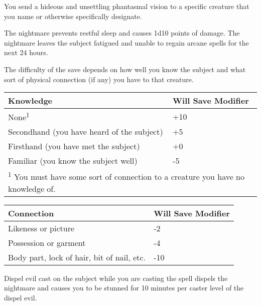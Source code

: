 \begin{multicols}{2}
\begin{small}

\noindent You send a hideous and unsettling phantasmal vision to a specific creature that you name or otherwise specifically designate.

\smallskip\noindent The nightmare prevents restful sleep and causes 1d10 points of damage. The nightmare leaves the subject fatigued and unable to regain arcane spells for the next 24 hours.

\smallskip\noindent The difficulty of the save depends on how well you know the subject and what sort of physical connection (if any) you have to that creature.

\begin{center}
\begin{tabular}[h!]{p{1.75in}|l}
Knowledge & Will Save Modifier \\ \hline
None\textsuperscript{1} & +10 \\
Secondhand (you have heard of the subject) & +5	\\
Firsthand (you have met the subject) & +0	\\
Familiar (you know the subject well) & -5	\\
\multicolumn{2}{p{3in}}{\textsuperscript{1} You must have some sort of connection to a creature you have no knowledge of.}
\end{tabular}
\end{center}

\begin{center}
\begin{tabular}[h!]{p{1.75in}|l}
Connection & Will Save Modifier \\ \hline
Likeness or picture & -2 \\
Possession or garment & -4 \\
Body part, lock of hair, bit of nail, etc. & -10 \\
\end{tabular}
\end{center}

\smallskip\noindent Dispel evil cast on the subject while you are casting the spell dispels the nightmare and causes you to be stunned for 10 minutes per caster level of the dispel evil.


\end{small}
\end{multicols}
